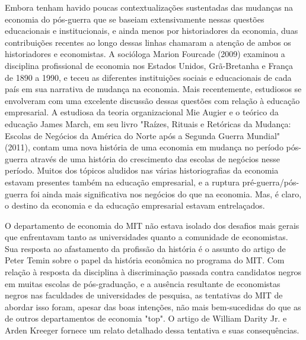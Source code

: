 \documentclass[12pt]{article}
\begin{document}
Embora tenham havido poucas contextualizações sustentadas das mudanças na economia do pós-guerra que se baseiam extensivamente nessas questões educacionais e institucionais, e ainda menos por historiadores da economia, duas contribuições recentes ao longo dessas linhas chamaram a atenção de ambos os historiadores e economistas. A socióloga Marion Fourcade (2009) examinou a disciplina profissional de economia nos Estados Unidos, Grã-Bretanha e França de 1890 a 1990, e teceu as diferentes instituições sociais e educacionais de cada país em sua narrativa de mudança na economia. Mais recentemente, estudiosos se envolveram com uma excelente discussão dessas questões com relação à educação empresarial. A estudiosa da teoria organizacional Mie Augier e o teórico da educação James March, em seu livro "Raízes, Rituais e Retóricas da Mudança: Escolas de Negócios da América do Norte após a Segunda Guerra Mundial" (2011), contam uma nova história de uma economia em mudança no período pós-guerra através de uma história do crescimento das escolas de negócios nesse período. Muitos dos tópicos aludidos nas várias historiografias da economia estavam presentes também na educação empresarial, e a ruptura pré-guerra/pós-guerra foi ainda mais significativa nos negócios do que na economia. Mas, é claro, o destino da economia e da educação empresarial estavam entrelaçados.

O departamento de economia do MIT não estava isolado dos desafios mais gerais que enfrentavam tanto as universidades quanto a comunidade de economistas. Sua resposta ao afastamento da profissão da história é o assunto do artigo de Peter Temin sobre o papel da história econômica no programa do MIT. Com relação à resposta da disciplina à discriminação passada contra candidatos negros em muitas escolas de pós-graduação, e a ausência resultante de economistas negros nas faculdades de universidades de pesquisa, as tentativas do MIT de abordar isso foram, apesar das boas intenções, não mais bem-sucedidas do que as de outros departamentos de economia "top". O artigo de William Darity Jr. e Arden Kreeger fornece um relato detalhado dessa tentativa e suas consequências.
\end{document}
